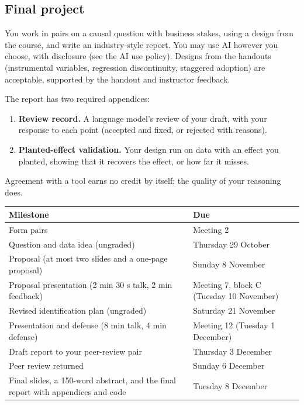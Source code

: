 \documentclass[11pt]{article}
\begin{document}
\subsection*{Final project}

You work in pairs on a causal question with business stakes, using a design from the course, and
write an industry-style report. You may use AI however you choose, with disclosure (see the AI use
policy). Designs from the handouts (instrumental variables, regression discontinuity, staggered
adoption) are acceptable, supported by the handout and instructor feedback.

The report has two required appendices:
\begin{enumerate}[label=(\alph*)]
    \item \textbf{Review record.} A language model's review of your draft, with your response to each
    point (accepted and fixed, or rejected with reasons).
    \item \textbf{Planted-effect validation.} Your design run on data with an effect you planted,
    showing that it recovers the effect, or how far it misses.
\end{enumerate}
Agreement with a tool earns no credit by itself; the quality of your reasoning does.

\begin{center}
\small
\begin{tabular}{L{7.6cm}L{7.4cm}}
\toprule
\textbf{Milestone} & \textbf{Due} \\
\midrule
Form pairs & Meeting 2 \\
Question and data idea (ungraded) & Thursday 29 October \\
Proposal (at most two slides and a one-page proposal) & Sunday 8 November \\
Proposal presentation (2 min 30 s talk, 2 min feedback) & Meeting 7, block C (Tuesday 10 November) \\
Revised identification plan (ungraded) & Saturday 21 November \\
Presentation and defense (8 min talk, 4 min defense) & Meeting 12 (Tuesday 1 December) \\
Draft report to your peer-review pair & Thursday 3 December \\
Peer review returned & Sunday 6 December \\
Final slides, a 150-word abstract, and the final report with appendices and code & Tuesday 8 December \\
\bottomrule
\end{tabular}
\end{center}
\end{document}

